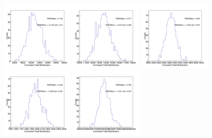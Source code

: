 \begin{figure}[h]
\begin{center}
\includegraphics[width= 0.32\textwidth]{Figures/Chapter4/BPCorrYield_0_90_7-10_Assym.png}
\includegraphics[width= 0.32\textwidth]{Figures/Chapter4/BPCorrYield_0_90_10-15_Assym.png}
\includegraphics[width= 0.32\textwidth]{Figures/Chapter4/BPCorrYield_0_90_15-20_Assym.png}
\includegraphics[width= 0.32\textwidth]{Figures/Chapter4/BPCorrYield_0_90_20-50_Assym.png}
\includegraphics[width= 0.32\textwidth]{Figures/Chapter4/BPCorrYield_0_90_10-50_Assym.png}

\end{center}
\end{figure}
